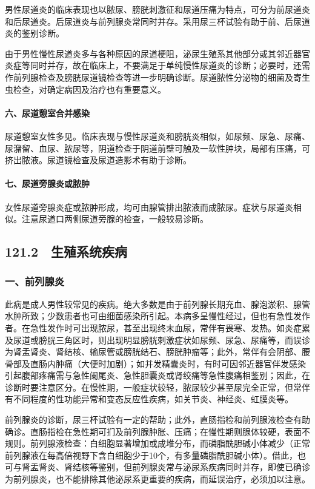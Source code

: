 男性尿道炎的临床表现也以脓尿、膀胱刺激征和尿道压痛为特点，可分为前尿道炎和后尿道炎。后尿道炎与前列腺炎常同时并存。采用尿三杯试验有助于前、后尿道炎的鉴别诊断。

由于男性慢性尿道炎多与各种原因的尿道梗阻，泌尿生殖系其他部分或其邻近器官炎症等同时并存，故在临床上，不要满足于单纯慢性尿道炎的诊断；必要时，还需作前列腺检查及膀胱尿道镜检查等进一步明确诊断。尿道脓性分泌物的细菌及寄生虫检查，对确定病因及治疗也有重要意义。

\paragraph{六、尿道憩室合并感染}

尿道憩室女性多见。临床表现与慢性尿道炎和膀胱炎相似，如尿频、尿急、尿痛、尿潴留、血尿、脓尿等，阴道检查于阴道前壁可触及一软性肿块，局部有压痛，可挤出脓液。尿道镜检查及尿道造影术有助于诊断。

\paragraph{七、尿道旁腺炎或脓肿}

女性尿道旁腺炎症或脓肿形成，均可由腺管排出脓液而成脓尿。症状与尿道炎相似。注意尿道口两侧尿道旁腺的检查，一般较易诊断。

\protect\hypertarget{text00284.html}{}{}

\subsection{121.2　生殖系统疾病}

\subsubsection{一、前列腺炎}

此病是成人男性较常见的疾病。绝大多数是由于前列腺长期充血、腺泡淤积、腺管水肿所致；少数患者也可由细菌感染所引起。本病多呈慢性经过，但也有急性发作者。在急性发作时可出现脓尿，甚至出现终末血尿，常伴有畏寒、发热。如炎症累及尿道或膀胱三角区时，则出现明显膀胱刺激症状如尿频、尿急、尿痛等，而误诊为肾盂肾炎、肾结核、输尿管或膀胱结石、膀胱肿瘤等；此外，常伴有会阴部、腰骨部及直肠内肿痛（大便时加剧）；如并发精囊炎时，有时可因邻近器官伴发感染引起腹部疼痛需与急性阑尾炎、急性胆囊炎或肾绞痛等急性腹痛相鉴别；因此，在诊断时要注意区分。在慢性期，一般症状较轻，脓尿较少甚至尿完全正常，但常伴有不同程度的性功能异常和变态反应性疾病，如关节炎、神经炎、虹膜炎等。

前列腺炎的诊断，尿三杯试验有一定的帮助；此外，直肠指检和前列腺液检查有助确诊。直肠指检在急性期可扪及前列腺肿胀、压痛；在慢性期则腺体较硬，表面不规则。前列腺液检查：白细胞显著增加或成堆分布，而磷脂酰胆碱小体减少（正常前列腺液在每高倍视野下含白细胞少于10个，有多量磷脂酰胆碱小体）。借此，也可与肾盂肾炎、肾结核等鉴别，但前列腺炎常与泌尿系疾病同时并存，即使已确诊为前列腺炎，也不能排除其他泌尿系更重要的疾病，而延误治疗，必须加以注意。

